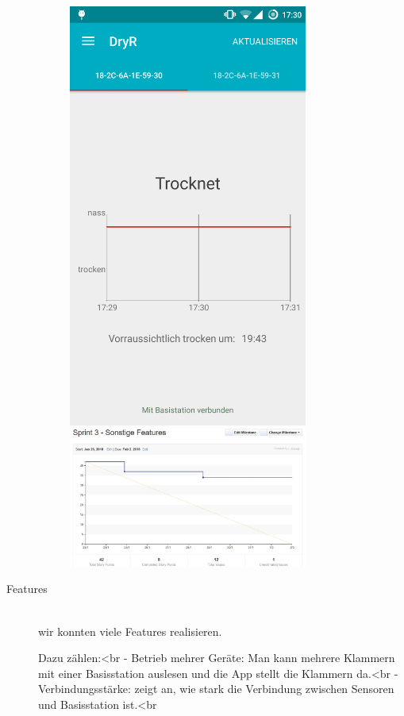 \begin{description}
\begin{description}
			\includegraphics[width=0.7\textwidth]{laundry_status_diagram_forecast.png}
			\includegraphics[width=0.7\textwidth]{burndown_sprint3.jpg}
		\end{description}
	\item [Features] \hfill \\
		wir konnten viele Features realisieren.
		\begin{description}
			Dazu zählen:<br\>
- Betrieb mehrer Geräte: Man kann mehrere Klammern mit einer Basisstation auslesen und die App stellt die Klammern da.<br\>
- Verbindungsstärke: zeigt an, wie stark die Verbindung zwischen Sensoren und Basisstation ist.<br\>

\end{description}
\end{description}
